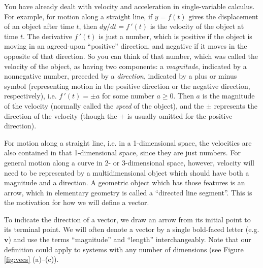 You have already dealt with velocity and acceleration in single-variable calculus.  For example, for motion along a
straight line, if $y = f(t)$ gives the displacement of an object after time $t$, then $dy/dt = f\,'(t)$ is the velocity
of the object at time $t$.  The derivative
$f\,'(t)$ is just a number, which is positive if the object is moving in an
agreed-upon ``positive'' direction, and negative if it moves in the opposite of that direction. So you can think of
that number, which was called the velocity of the object, as having two components: a \emph{magnitude}, indicated by
a nonnegative number, preceded by a \emph{direction}, indicated by a plus or minus symbol (representing motion in the
positive direction or the negative direction, respectively), i.e. $f\,'(t) = \pm a$ for some number $a \ge 0$.  Then
$a$ is the magnitude of the velocity (normally called the \emph{speed} of the object), and the $\pm$ represents the
direction of the velocity (though the $+$ is usually omitted for the positive direction).

For motion along a straight line, i.e. in a 1-dimensional space, the velocities are also contained in that 1-dimensional space, since they are just numbers.  
For general motion along a curve in 2- or 3-dimensional space,
however, velocity will need to be represented by a multidimensional object which should have both a magnitude and a
direction.  
A geometric object which has those features is an arrow, which in elementary geometry is called a
``directed line segment''.  This is the motivation for how we will define a vector.


To indicate the direction of a vector, we draw an arrow from its initial point to its terminal
point. We will often denote a vector by a single bold-faced letter (e.g. $\textbf{v}$) and use the terms
``magnitude'' and ``length'' interchangeably.
Note that our definition could apply to systems with any number of dimensions (see Figure \ref{fig:vecs}
(a)--(c)).

